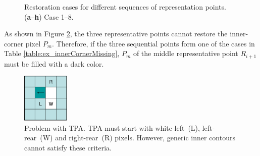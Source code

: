 \documentclass[sensors,article,accept,moreauthors,pdftex,10pt,a4paper]{mdpi}
\begin{document}
\begin{figure}[H]
	 
	\caption{Restoration cases for different sequences of representation points. (\textbf{a}--\textbf{h}) Case 1--8.}
	\label{fig:image14}
\end{figure}




As shown in Figure \ref{fig:image15}, the three representative points cannot restore the inner-corner pixel $P_m$. Therefore, if the three sequential points form one of the cases in Table \ref{table:ex_innerCornerMissing}, $P_m$ of the middle representative point $R_{i+1}$ must be filled with a dark color. 


\begin{figure}[H]
	\centering
	\includegraphics[width=0.2\textwidth]{5.ExperimentalResult/fig15.png}
	\caption{Problem with TPA. TPA must start with white left~(L), left-rear~(W) and right-rear~(R) pixels. However, generic inner contours cannot satisfy these criteria.}
	\label{fig:image15}
\end{figure}
\end{document}
